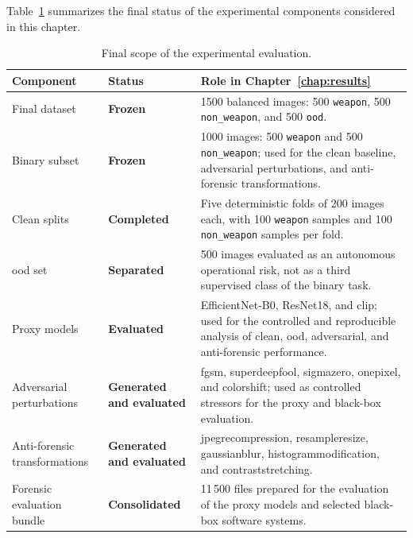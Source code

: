 Table~\ref{tab:results-evaluation-scope} summarizes the final status of the
experimental components considered in this chapter.

\begin{table}[H]
\centering
\scriptsize
\renewcommand{\arraystretch}{1.15}
\setlength{\tabcolsep}{4pt}
\caption{Final scope of the experimental evaluation.}
\label{tab:results-evaluation-scope}
\begin{tabularx}{\textwidth}{@{}p{} p{} X@{}}
\toprule
\textbf{Component} & \textbf{Status} & \textbf{Role in Chapter~\ref{chap:results}} \\
\midrule

Final dataset &
\textbf{Frozen} &
1500 balanced images: 500 \texttt{weapon}, 500 \texttt{non\_weapon}, and
500 \texttt{ood}. \\

Binary subset &
\textbf{Frozen} &
1000 images: 500 \texttt{weapon} and 500 \texttt{non\_weapon}; used for the
clean baseline, adversarial perturbations, and anti-forensic transformations. \\

Clean splits &
\textbf{Completed} &
Five deterministic folds of 200 images each, with 100 \texttt{weapon} samples
and 100 \texttt{non\_weapon} samples per fold. \\

\gls{ood} set &
\textbf{Separated} &
500 images evaluated as an autonomous operational risk, not as a third
supervised class of the binary task. \\

Proxy models &
\textbf{Evaluated} &
EfficientNet-B0, ResNet18, and \gls{clip}; used for the controlled and
reproducible analysis of clean, \gls{ood}, adversarial, and anti-forensic
performance. \\

Adversarial perturbations &
\textbf{Generated and evaluated} &
\gls{fgsm}, \gls{superdeepfool}, \gls{sigmazero}, \gls{onepixel}, and
\gls{colorshift}; used as controlled stressors for the proxy and black-box
evaluation. \\

Anti-forensic transformations &
\textbf{Generated and evaluated} &
\gls{jpegrecompression}, \gls{resampleresize}, \gls{gaussianblur},
\gls{histogrammodification}, and \gls{contraststretching}. \\

Forensic evaluation bundle &
\textbf{Consolidated} &
11\,500 files prepared for the evaluation of the proxy models and selected
black-box software systems. \\


\end{tabularx}
\end{table}
